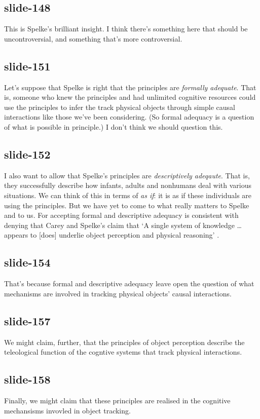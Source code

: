 \documentclass[12pt,\papersize]{extarticle}
\begin{document}
 
\subsection{slide-148}
This is Spelke's brilliant insight.
I think there's something here that should be uncontroversial, and something that's more controversial.
 
 
\subsection{slide-151}
Let's suppose that Spelke is right that the principles are \emph{formally adequate}.
That is, someone who knew the principles and had unlimited cognitive resources could use the principles to infer the track physical objects through simple causal interactions like those we've been considering.
(So formal adequacy is a question of what is possible in principle.)
I don't think we should question this.
 
 
\subsection{slide-152}
I also want to allow that Spelke's principles are \emph{descriptively adeqaute}.
That is, they successfully describe how infants, adults and nonhumans deal with various situations.
We can think of this in terms of \emph{as if}: it is as if these individuals are using the principles.
But we have yet to come to what really matters to Spelke and to us.
For accepting formal and descriptive adequacy is consistent with denying that Carey and Spelke's claim that ‘A single system of knowledge … appears to [does] underlie object perception and physical reasoning’ \citep[p.\ 175]{Carey:1994bh}.
 
 
\subsection{slide-154}
That's because formal and descriptive adequacy leave open the question of what mechanisms are involved in tracking physical objects' causal interactions.
 
 
\subsection{slide-157}
We might claim, further, that the principles of object perception describe the teleological function of the cogntive systems that track physical interactions.
 
 
\subsection{slide-158}
Finally, we might claim that these principles are realised in the cognitive mechansisms invovled in object tracking.
 
\end{document}
